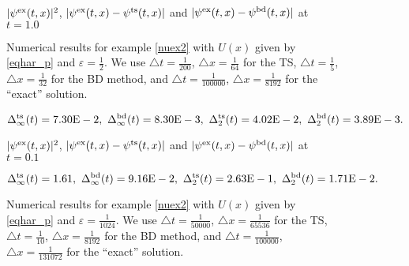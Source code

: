 \documentclass[leqno,final]{siamltex}
\numberwithin{equation}{section}
\newcounter{me}
\begin{document}
\begin{figure} \footnotesize
\begin{center}

$|\psi^{\rm ex}(t,x)|^2$, $|\psi^{\rm ex}(t,x)-\psi^{\rm
ts}(t,x)|$ and $|\psi^{\rm ex}(t,x)-\psi^{\rm bd}(t,x)|$ at
$t=1.0$\vspace{-1mm} \caption{Numerical results for example
\ref{nuex2} with $U(x)$ given by \eqref{eqhar_p} and
${{\varepsilon }}={\frac{{1}}{{2}}}$. We use ${\triangle} t={\frac{{1}}{{200}}}$, ${\triangle} x={\frac{{1}}{{64}}}$ for
the TS, ${\triangle} t={\frac{{1}}{{5}}}$, ${\triangle} x={\frac{{1}}{{32}}}$ for the BD method, and
${\triangle} t={\frac{{1}}{{100000}}}$, ${\triangle} x={\frac{{1}}{{8192}}}$ for the ``exact''
solution. \vspace{-3mm}}\label{fig21}
\[\Delta^{\rm ts}_\infty(t)=7.30{\rm{E}}-2,\
\Delta^{\rm bd}_\infty(t)=8.30{\rm{E}}-3,\
\Delta^{\rm ts}_2(t)= 4.02{\rm{E}}-2,\
\Delta^{\rm bd}_2(t)= 3.89{\rm{E}}-3.\]\vspace{1mm}

\resizebox{1.5in}{!}{\texttt{[image: 2ha\_sp.eps]}}

$|\psi^{\rm ex}(t,x)|^2$, $|\psi^{\rm ex}(t,x)-\psi^{\rm ts}(t,x)|$
and $|\psi^{\rm ex}(t,x)-\psi^{\rm bd}(t,x)|$ at $t=0.1$\vspace{-1mm}
\end{center}
\caption{Numerical results for example \ref{nuex2} with $U(x)$
given by \eqref{eqhar_p} and ${{\varepsilon }}={\frac{{1}}{{1024}}}$. We use ${\triangle}
t={\frac{{1}}{{50000}}}$, ${\triangle} x={\frac{{1}}{{65536}}}$ for the TS, ${\triangle}
t={\frac{{1}}{{10}}}$, ${\triangle} x={\frac{{1}}{{8192}}}$ for the BD method, and ${\triangle}
t={\frac{{1}}{{100000}}}$, ${\triangle} x={\frac{{1}}{{131072}}}$ for the ``exact''
solution. }\label{fig23}\vspace{-3mm}
\[\Delta^{\rm ts}_\infty(t)=1.61,\
\Delta^{\rm bd}_\infty(t)=9.16{\rm{E}}-2,\
\Delta^{\rm ts}_2(t)=2.63{\rm{E}}-1,\
\Delta^{\rm bd}_2(t)= 1.71{\rm{E}}-2.\]
\end{figure}
\end{document}
